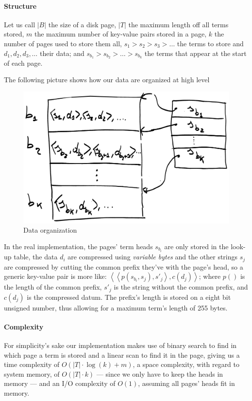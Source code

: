 \paragraph{Structure}
Let us call $|B|$ the size of a disk page, $|T|$ the maximum length off all terms stored, $m$ the maximum number of key-value pairs stored in a page, $k$ the number of pages used to store them all, $s_1 > s_2 > s_3 > \dots$ the terms to store and $d_1, d_2, d_3, \dots$ their data; and $s_{b_1} > s_{b_2} > \dots > s_{b_k}$ the terms that appear at the start of each page.

The following picture shows how our data are organized at high level

\begin{figure}[H]
	\centering
	\includegraphics[width=0.6\linewidth]{assets/disk_map_base}
	\caption[]{Data organization}
	\label{fig:diskmapbase}
\end{figure}

In the real implementation, the pages' term heads $s_{b_i}$ are only stored in the look-up table, the data $d_i$ are compressed using \textit{variable bytes} and the other strings $s_j$ are compressed by cutting the common prefix they've with the page's head, so a generic key-value pair is more like:
$\left<	\left< p(s_{b_i}, s_j), {s'}_j \right>, c(d_j)	\right>$; where $p()$ is the length of the common prefix, $ {s'}_j$ is the string without the common prefix, and $c(d_j)$ is the compressed datum. The prefix's length is stored on a eight bit unsigned number, thus allowing for a maximum term's length of 255 bytes.

\paragraph{Complexity}
For simplicity's sake our implementation makes use of binary search to find in which page a term is stored and a linear scan to find it in the page, giving us a time complexity of 
$O\left(	|T|\cdot\log(k) + m	\right)$,
a space complexity, with regard to system memory, of
$O\left(	|T|\cdot k	\right)$
--- since we only have to keep the heads in memory --- and an I/O complexity of
$O\left(	1	\right)$, assuming all pages' heads fit in memory.

